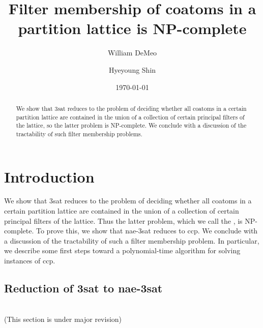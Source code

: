 \documentclass[12pt]{amsart}
\numberwithin{equation}{section}
\theoremstyle{plain}
\theoremstyle{definition}
\newcommand{\ccp}{\acs{ccp}\xspace}
\newcommand{\sat}{\acs{sat}\xspace}
\newcommand{\nae}{\acs{nae}\xspace}
\newcommand{\NP}{\acs{NP}\xspace}
\begin{document}
\title[NP-completeness of coatom counting]{Filter membership of coatoms
  in a\\ partition lattice is NP-complete}
\date{\today}
\author[W.~DeMeo]{William DeMeo}
\address{University of Hawaii}

\author[H.~Shin]{Hyeyoung Shin}
\address{University of Hawaii}


\maketitle

\begin{abstract}
We show that 3\sat %
reduces to the problem of deciding whether all coatoms in a certain partition
lattice are contained in the union of a collection of certain principal filters
of the lattice, so the latter problem is \NP-complete.
We conclude with a discussion of the tractability of
such filter membership problems.
\end{abstract}

\section{Introduction}
\label{sec:introduction}
We show that 3\sat %
reduces to the problem of deciding whether all coatoms in a certain partition
lattice are contained in the union of a collection of certain principal filters
of the lattice. Thus the latter problem, which we call the
, is \NP-complete.
To prove this, we show that \nae-3\sat reduces to \ccp.
We conclude with a discussion of the tractability of
such a filter membership problem. In particular, we describe some first steps
toward a polynomial-time algorithm for solving instances of \ccp.

\subsection{Reduction of 3\sat to \nae-3\sat}
\\
(This section is under major revision)

\end{document}
